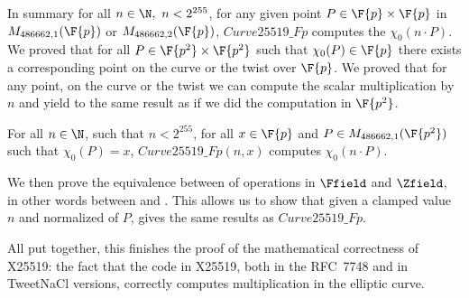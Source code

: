 In summary for all $n \in \N,\ n < 2^{255}$, for any given point $P\in\F{p}\times\F{p}$
in $M_{486662,1}(\F{p})$ or $M_{486662,2}(\F{p})$, $Curve25519\_Fp$
computes the $\chi_0(n \cdot P)$.
We proved that for all $P \in \F{p^2}\times\F{p^2}$ such that $\chi_0(P) \in \F{p}$
there exists a corresponding point on the curve or the twist over $\F{p}$.
We proved that for any point, on the curve or the twist we can compute the
scalar multiplication by $n$ and yield to the same result as if we did the
computation in $\F{p^2}$.
\begin{theorem}
  \label{thm:general-scalarmult}
  For all $n \in \N$, such that $n < 2^{255}$,
  for all $x \in \F{p}$ and $P \in M_{486662,1}(\F{p^2})$ such that $\chi_0(P) = x$,
  $Curve25519\_Fp(n,x)$ computes $\chi_0(n \cdot P)$.
\end{theorem}

We then prove the equivalence between of operations in $\Ffield$ and $\Zfield$,
in other words between  and .
This allows us to show that given a clamped value $n$ and normalized \xcoord of $P$,
 gives the same results as $Curve25519\_Fp$.

All put together, this finishes the proof of the mathematical correctness of X25519: the fact that the code in X25519, both in the RFC~7748 and
in TweetNaCl versions, correctly computes multiplication in the elliptic curve.
